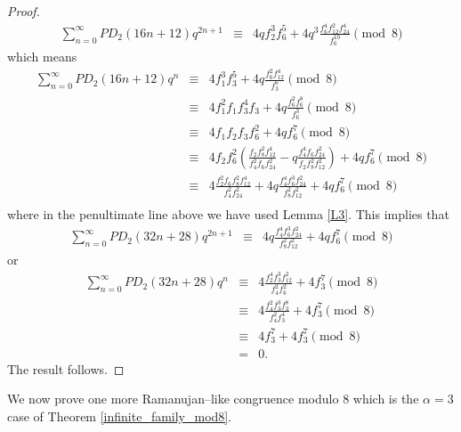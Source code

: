 \documentclass{amsart}
\begin{document}
\begin{proof}
\begin{eqnarray*}
\sum_{n=0}^\infty PD_2(16n+12)q^{2n+1} 
&\equiv & 
4qf_2^3f_6^5 + 4q^3 \frac{f_6^4f_{12}^2f_{24}^4}{f_6^{10}}   \pmod{8}
\end{eqnarray*}
which means 
\begin{eqnarray*}
\sum_{n=0}^\infty PD_2(16n+12)q^{n} 
&\equiv & 
4f_1^3f_3^5 + 4q \frac{f_{6}^2f_{12}^4}{f_3^{6}}   \pmod{8} \\
&\equiv &
4f_1^2f_1f_3^4f_3 + 4q \frac{f_{6}^2f_{6}^8}{f_6^{3}}   \pmod{8} \\
&\equiv &
4f_1f_2f_3f_6^2 + 4q f_6^7   \pmod{8} \\
&\equiv & 
4f_2f_6^2\left( \frac{f_2f_8^2f_{12}^4}{f_4^2f_6f_{24}^2} - q \frac{f_4^4f_6f_{24}^2}{f_2f_8^2f_{12}^2} \right)  + 4q f_6^7   \pmod{8} \\
&\equiv & 
4\frac{f_2^2f_6f_8^2f_{12}^4}{f_4^2f_{24}^2} +4q \frac{f_4^4f_6^3f_{24}^2}{f_8^2f_{12}^2}  + 4q f_6^7   \pmod{8} \\
\end{eqnarray*}
where in the penultimate line above we have used Lemma \ref{L3}.
This implies that 
\begin{eqnarray*}
\sum_{n=0}^\infty PD_2(32n+28)q^{2n+1} 
&\equiv & 
4q \frac{f_4^4f_6^3f_{24}^2}{f_8^2f_{12}^2}  + 4q f_6^7   \pmod{8} 
\end{eqnarray*}
or 
\begin{eqnarray*}
\sum_{n=0}^\infty PD_2(32n+28)q^{n} 
&\equiv & 
4\frac{f_2^4f_3^3f_{12}^2}{f_4^2f_{6}^2}  + 4 f_3^7   \pmod{8} \\
&\equiv & 
4\frac{f_4^2f_3^3f_{3}^8}{f_4^2f_{3}^4}  + 4 f_3^7   \pmod{8} \\
&\equiv & 
4 f_3^7   + 4 f_3^7   \pmod{8} \\
&=& 
0.
\end{eqnarray*}
The result follows. 
\end{proof}
We now prove one more Ramanujan--like congruence modulo 8 which is the $\alpha=3$ case of Theorem \ref{infinite_family_mod8}.  
\end{document}

